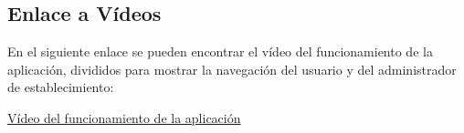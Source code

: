 \subsection{Enlace a Vídeos}

En el siguiente enlace se pueden encontrar el vídeo del funcionamiento de la aplicación, divididos para mostrar la navegación del usuario y del administrador de establecimiento:

\href{https://youtu.be/Tzmj9JLn8yU}{Vídeo del funcionamiento de la aplicación}